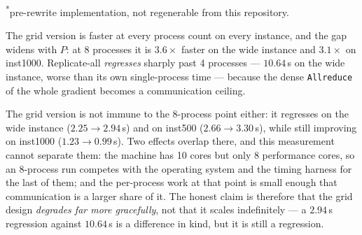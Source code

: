 \documentclass[twocolumn]{article}
\begin{document}
    \begin{table}[!h]
        \caption{\label{tab:grid-vs-rep}Replicate-all vs.\ 2D-grid (time, s). Grid rows:
        measured now, this laptop. Replicate rows: pre-rewrite, same machine, not
        regenerable.}
        \centering

        \footnotesize\textsuperscript{*}pre-rewrite implementation, not regenerable from
        this repository.
    \end{table}

    The grid version is faster at every process count on every instance, and the gap
    widens with $P$: at 8 processes it is $3.6\times$ faster on the wide instance and
    $3.1\times$ on inst1000. Replicate-all \emph{regresses} sharply past 4 processes ---
    $10.64$\,s on the wide instance, worse than its own single-process time --- because
    the dense \texttt{Allreduce} of the whole gradient becomes a communication ceiling.

    The grid version is not immune to the 8-process point either: it regresses on the wide
    instance ($2.25 \to 2.94$\,s) and on inst500 ($2.66 \to 3.30$\,s), while still
    improving on inst1000 ($1.23 \to 0.99$\,s). Two effects overlap there, and this
    measurement cannot separate them: the machine has 10 cores but only 8 performance
    cores, so an 8-process run competes with the operating system and the timing harness
    for the last of them; and the per-process work at that point is small enough that
    communication is a larger share of it. The honest claim is therefore that the grid
    design \emph{degrades far more gracefully}, not that it scales indefinitely --- a
    $2.94$\,s regression against $10.64$\,s is a difference in kind, but it is still a
    regression.
\end{document}
